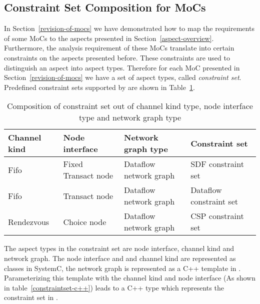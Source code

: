 \subsection{Constraint Set Composition for MoCs}

In Section~\ref{revision-of-mocs} we have demonstrated how
to map the requirements of some MoCs to the aspects presented
in Section~\ref{aspect-overview}. Furthermore, the analysis
requirement of these MoCs translate into certain constraints
on the aspects presented before. These constraints are
used to distinguish an aspect into aspect types. Therefore
for each MoC presented in Section~\ref{revision-of-mocs}
we have a set of aspect types, called \emph{constraint set}.
Predefined constraint sets supported by \SysteMoC{} are
shown in Table~\ref{constraintset-composition}.

\begin{table}[h]
\centering
\begin{tabular}{|l|l|l|l|}
\hline
 Channel kind & Node interface & Network graph type & Constraint set \\
\hline \hline
 Fifo         & Fixed Transact node & Dataflow network graph & SDF constraint set \\
 Fifo         & Transact node       & Dataflow network graph & Dataflow constraint set \\
 Rendezvous   & Choice node         & Dataflow network graph & CSP constraint set \\
\hline
\end{tabular}
\caption{\label{constraintset-composition}
  Composition of constraint set out of channel kind type, node interface type
  and network graph type}
\end{table}

The aspect types in the constraint set are node interface,
channel kind and network graph. The node interface and
and channel kind are represented as \SysteMoC{} classes in
SystemC, the network graph is represented as
a C++ template in \SysteMoC{}. Parameterizing this template
with the channel kind and node interface (As shown in
table~\ref{constraintset-c++}) leads to a C++
type which represents the constraint set in \SysteMoC{}.

